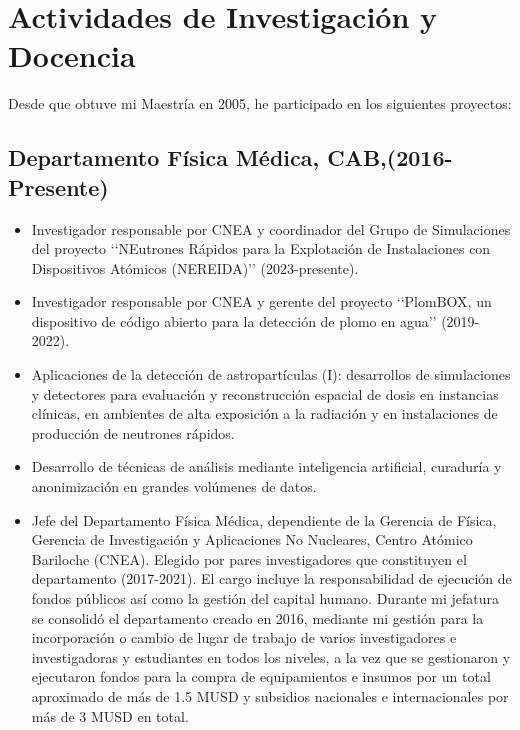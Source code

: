 \section*{Actividades de Investigación y Docencia}

Desde que obtuve mi Maestría en 2005, he participado en los siguientes proyectos:

\subsection*{Departamento Física Médica, CAB,(2016-Presente)}
\begin{itemize}
	\item Investigador responsable por CNEA y coordinador del Grupo de Simulaciones del proyecto \lq\lq{}NEutrones Rápidos para la Explotación de Instalaciones con Dispositivos Atómicos (NEREIDA)\rq\rq{} (2023-presente).
	\item Investigador responsable por CNEA y gerente del proyecto \lq\lq{}PlomBOX, un dispositivo de código abierto para la detección de plomo en agua\rq\rq{} (2019-2022).
	\item Aplicaciones de la detección de astropartículas (I): desarrollos de simulaciones y detectores para evaluación y reconstrucción espacial de dosis en instancias clínicas, en ambientes de alta exposición a la radiación y en instalaciones de producción de neutrones rápidos.
	\item Desarrollo de técnicas de análisis mediante inteligencia artificial, curaduría y anonimización en grandes volúmenes de datos.
 	\item Jefe del Departamento Física Médica, dependiente de la Gerencia de Física, Gerencia de Investigación y Aplicaciones No Nucleares, Centro Atómico Bariloche (CNEA).
 	Elegido por pares investigadores que constituyen el departamento (2017-2021).
 	El cargo incluye la responsabilidad de ejecución de fondos públicos así como la gestión del capital humano.
 	Durante mi jefatura se consolidó el departamento creado en 2016, mediante mi gestión para la incorporación o cambio de lugar de trabajo de varios investigadores e investigadoras y estudiantes en todos los niveles, a la vez que se gestionaron y ejecutaron fondos para la compra de equipamientos e insumos por un total aproximado de más de 1.5 MUSD y subsidios nacionales e internacionales por más de 3 MUSD en total.
\end{itemize}

